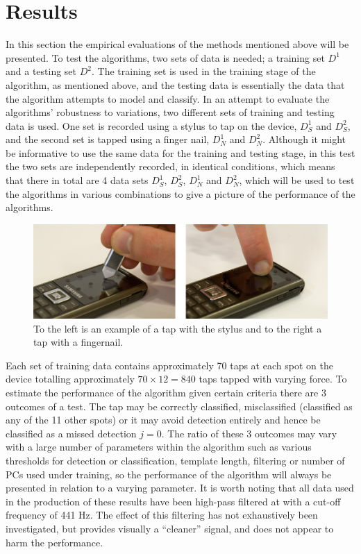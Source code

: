 \section{Results}\label{sec:results}
In this section the empirical evaluations of the methods mentioned above will be presented. To test the algorithms, two sets of data is needed; a training set $D^1$ and a testing set $D^2$. The training set is used in the training stage of the algorithm, as mentioned above, and the testing data is essentially the data that the algorithm attempts to model and classify. In an attempt to evaluate the algorithms' robustness to variations, two different sets of training and testing data is used. One set is recorded using a stylus to tap on the device, $D^1_S$ and $D^2_S$, and the second set is tapped using a finger nail, $D^1_N$ and $D^2_N$. Although it might be informative to use the same data for the training and testing stage, in this test the two sets are independently recorded, in identical conditions, which means that there in total are 4 data sets $D^1_S$, $D^2_S$, $D^1_N$ and $D^2_N$, which will be used to test the algorithms in various combinations to give a picture of the performance of the algorithms.

\begin{figure}[!]
\centering
\includegraphics[width=410 px]{tapSN.pdf}
\caption{To the left is an example of a tap with the stylus and to the right a tap with a fingernail.}\label{fig:tapSN}
\end{figure}

 Each set of training data contains approximately 70 taps at each spot on the device totalling approximately $70 \times 12 = 840$ taps tapped with varying force. To estimate the performance of the algorithm given certain criteria there are 3 outcomes of a test. The tap may be correctly classified, misclassified (classified as any of the 11 other spots) or it may avoid detection entirely and hence be classified as a missed detection $j=0$. The ratio of these 3 outcomes may vary with a large number of parameters within the algorithm such as various thresholds for detection or classification, template length, filtering or number of PCs used under training, so the performance of the algorithm will always be presented in relation to a varying parameter. It is worth noting that all data used in the production of these results have been high-pass filtered at with a cut-off frequency of 441 Hz. The effect of this filtering has not exhaustively been investigated, but provides visually a ``cleaner'' signal, and does not appear to harm the performance.

